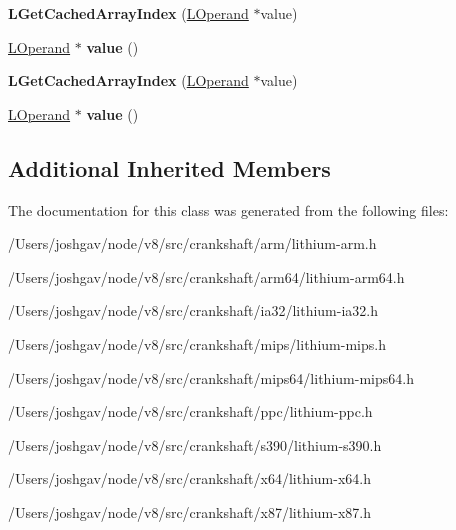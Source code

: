 \begin{DoxyCompactItemize}
\item 
{\bfseries L\+Get\+Cached\+Array\+Index} (\hyperlink{classv8_1_1internal_1_1_l_operand}{L\+Operand} $\ast$value)\hypertarget{classv8_1_1internal_1_1_l_get_cached_array_index_ac1b0e4f8734295de570423046bb2650c}{}\label{classv8_1_1internal_1_1_l_get_cached_array_index_ac1b0e4f8734295de570423046bb2650c}

\item 
\hyperlink{classv8_1_1internal_1_1_l_operand}{L\+Operand} $\ast$ {\bfseries value} ()\hypertarget{classv8_1_1internal_1_1_l_get_cached_array_index_a4d03283603300a485c1195f1ee7a35fe}{}\label{classv8_1_1internal_1_1_l_get_cached_array_index_a4d03283603300a485c1195f1ee7a35fe}

\item 
{\bfseries L\+Get\+Cached\+Array\+Index} (\hyperlink{classv8_1_1internal_1_1_l_operand}{L\+Operand} $\ast$value)\hypertarget{classv8_1_1internal_1_1_l_get_cached_array_index_ac1b0e4f8734295de570423046bb2650c}{}\label{classv8_1_1internal_1_1_l_get_cached_array_index_ac1b0e4f8734295de570423046bb2650c}

\item 
\hyperlink{classv8_1_1internal_1_1_l_operand}{L\+Operand} $\ast$ {\bfseries value} ()\hypertarget{classv8_1_1internal_1_1_l_get_cached_array_index_a4d03283603300a485c1195f1ee7a35fe}{}\label{classv8_1_1internal_1_1_l_get_cached_array_index_a4d03283603300a485c1195f1ee7a35fe}

\end{DoxyCompactItemize}
\subsection*{Additional Inherited Members}


The documentation for this class was generated from the following files\+:\begin{DoxyCompactItemize}
\item 
/\+Users/joshgav/node/v8/src/crankshaft/arm/lithium-\/arm.\+h\item 
/\+Users/joshgav/node/v8/src/crankshaft/arm64/lithium-\/arm64.\+h\item 
/\+Users/joshgav/node/v8/src/crankshaft/ia32/lithium-\/ia32.\+h\item 
/\+Users/joshgav/node/v8/src/crankshaft/mips/lithium-\/mips.\+h\item 
/\+Users/joshgav/node/v8/src/crankshaft/mips64/lithium-\/mips64.\+h\item 
/\+Users/joshgav/node/v8/src/crankshaft/ppc/lithium-\/ppc.\+h\item 
/\+Users/joshgav/node/v8/src/crankshaft/s390/lithium-\/s390.\+h\item 
/\+Users/joshgav/node/v8/src/crankshaft/x64/lithium-\/x64.\+h\item 
/\+Users/joshgav/node/v8/src/crankshaft/x87/lithium-\/x87.\+h\end{DoxyCompactItemize}
